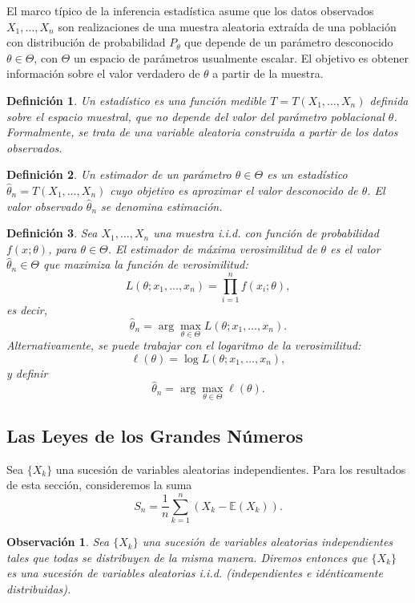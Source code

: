 \documentclass{report}
\newtheorem{dfn}{Definición}[section]
\newtheorem{obs}{Observación}[section]
\begin{document}
El marco típico de la inferencia estadística asume que los datos observados \( X_1, \dots, X_n \) son realizaciones de una muestra aleatoria extraída de una
población con distribución de probabilidad \( P_\theta \) que depende de un parámetro desconocido \( \theta \in \Theta \), con \(\Theta \) un espacio de parámetros usualmente escalar. El objetivo es obtener información
sobre el valor verdadero de \( \theta \) a partir de la muestra.

\begin{dfn}
Un \emph{estadístico} es una función medible \( T = T(X_1, \dots, X_n) \) definida sobre el espacio muestral, que no depende del valor del parámetro poblacional
\( \theta \). Formalmente, se trata de una variable aleatoria construida a partir de los datos observados.
\end{dfn}

\begin{dfn}
Un \emph{estimador} de un parámetro \( \theta \in \Theta \) es un estadístico \( \hat{\theta}_n = T(X_1, \dots, X_n) \) cuyo objetivo es aproximar el valor
desconocido de \( \theta \). El valor observado \( \hat{\theta}_n \) se denomina \emph{estimación}.
\end{dfn}

\begin{dfn}
Sea \( X_1, \dots, X_n \) una muestra i.i.d. con función de probabilidad \( f(x;\theta) \), para \( \theta \in \Theta \). El \emph{estimador de máxima verosimilitud}
de \( \theta \) es el valor \( \hat{\theta}_n \in \Theta \) que maximiza la función de verosimilitud:
\[
L(\theta; x_1, \dots, x_n) = \prod_{i=1}^n f(x_i; \theta),
\]
es decir,
\[
\hat{\theta}_n = \arg\max_{\theta \in \Theta} L(\theta; x_1, \dots, x_n).
\]
Alternativamente, se puede trabajar con el logaritmo de la verosimilitud:
\[
\ell(\theta) = \log L(\theta; x_1, \dots, x_n),
\]
y definir
\[
\hat{\theta}_n = \arg\max_{\theta \in \Theta} \ell(\theta).
\]
\end{dfn}

\subsection{Las Leyes de los Grandes Números}

Sea $\{X_k\}$ una sucesión de variables aleatorias independientes. Para los resultados de esta sección, consideremos la suma
$$ S_n = \frac{1}{n}\sum_{k=1}^{n}(X_k-\mathbb{E}(X_k)).$$

\begin{obs}
Sea $\{X_k\}$ una sucesión de variables aleatorias independientes tales que todas se distribuyen de la misma manera.
Diremos entonces que  $\{X_k\}$ es una sucesión de variables aleatorias \emph{i.i.d.} (independientes e idénticamente
distribuidas).
\end{obs}
\end{document}
